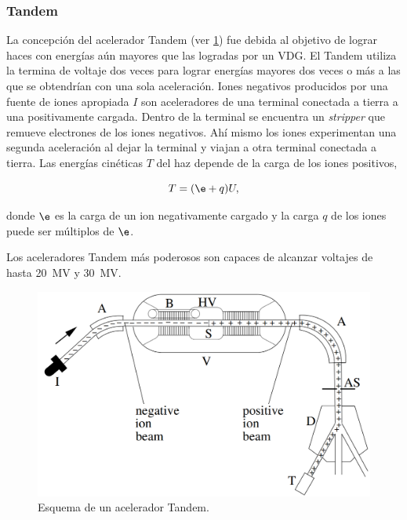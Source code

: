 \documentclass[12pt]{article}
\theoremstyle{break}
\theoremstyle{nonumberbreak}
\begin{document}
    \subsubsection{Tandem}

    La concepción del acelerador Tandem (ver \cref{fig:tandem}) fue debida al objetivo de lograr haces con energías aún mayores que las logradas por un VDG. El Tandem utiliza la termina de voltaje dos veces para lograr energías mayores dos veces o más a las que se obtendrían con una sola aceleración. Iones negativos producidos por una fuente de iones apropiada \(I\) son aceleradores de una terminal conectada a tierra a una positivamente cargada. Dentro de la terminal se encuentra un \emph{stripper} que remueve electrones de los iones negativos. Ahí mismo los iones experimentan una segunda aceleración al dejar la terminal y viajan a otra terminal conectada a tierra. Las energías cinéticas \(T\) del haz depende de la carga de los iones positivos,

    \begin{equation*}
      T = (\e + q)U,
    \end{equation*}

    donde \(\e\) es la carga de un ion negativamente cargado y la carga \(q\) de los iones puede ser múltiplos de \(\e\).

    Los aceleradores Tandem más poderosos son capaces de alcanzar voltajes de hasta \qty{20}{\mega\V} y \qty{30}{\mega\V}.

    \begin{figure}[htb]
        \centering
        \includegraphics[scale=0.5]{tandem}
        \caption{Esquema de un acelerador Tandem.\cite{Hinterberger:1005042}}
        \label{fig:tandem}
    \end{figure}
\end{document}
